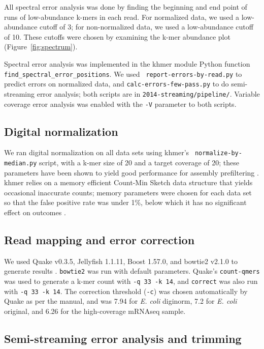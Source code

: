 \documentclass{article}
\begin{document}
All spectral error analysis was done by finding the beginning and end
point of runs of low-abundance k-mers in each read.  For normalized
data, we used a low-abundance cutoff of 3; for non-normalized data, we
used a low-abundance cutoff of 10.  These cutoffs were chosen by
examining the k-mer abundance plot (Figure~\ref{fig:spectrum}).

Spectral error analysis was implemented in the khmer module Python
function {\tt find\_spectral\_error\_positions}. We used {\tt
  report-errors-by-read.py} to predict errors on normalized data, and
{\tt calc-errors-few-pass.py} to do semi-streaming error analysis;
both scripts are in {\tt 2014-streaming/pipeline/}.  Variable coverage
error analysis was enabled with the {\tt -V} parameter to both scripts.

\subsection{Digital normalization}

We ran digital normalization on all data sets using khmer's {\tt
  normalize-by-median.py} script, with a k-mer size of 20 and a target
coverage of 20; these parameters have been shown to yield good
performance for assembly prefiltering \cite{Brown2012,Lowe2015}.
khmer relies on a memory efficient Count-Min Sketch data structure
that yields occasional inaccurate counts; memory parameters were
chosen for each data set so that the false positive rate was under
1\%, below which it has no significant effect on outcomes
\cite{Zhang2014}.

\subsection{Read mapping and error correction}

We used Quake v0.3.5, Jellyfish 1.1.11, Boost 1.57.0, and bowtie2
v2.1.0 to generate results \cite{quake,jellyfish,bowtie2}.  {\tt bowtie2} was run with
default parameters.  Quake's {\tt count-qmers} was used to generate a
k-mer count with {\tt -q 33 -k 14}, and {\tt correct} was also run
with {\tt -q 33 -k 14}.  The correction threshold ({\tt -c}) was
chosen automatically by Quake as per the manual, and was 7.94 for {\em
  E. coli} diginorm, 7.2 for {\em E. coli} original, and 6.26 for
the high-coverage mRNAseq sample.

\subsection{Semi-streaming error analysis and trimming}
\end{document}
